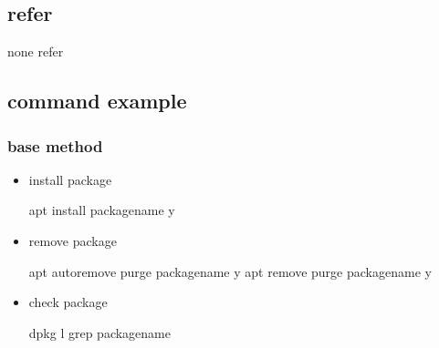 \documentclass[a4paper,10pt,english]{sphinxmanual}
\begin{document}
\subsection{refer}
\label{\detokenize{linux/apt:refer}}
none refer


\subsection{command example}
\label{\detokenize{linux/apt:command-example}}

\subsubsection{base method}
\label{\detokenize{linux/apt:base-method}}\begin{itemize}
\item {} 
install package

\begin{sphinxVerbatim}[commandchars=\\\{\}]
\PYGZdl{} apt install package\PYGZus{}name  \PYGZhy{}y
\end{sphinxVerbatim}

\item {} 
remove package

\begin{sphinxVerbatim}[commandchars=\\\{\}]
\PYGZdl{} apt autoremove \PYGZhy{}\PYGZhy{}purge package\PYGZus{}name \PYGZhy{}y
\PYGZdl{} apt remove \PYGZhy{}\PYGZhy{}purge package\PYGZus{}name \PYGZhy{}y
\end{sphinxVerbatim}

\item {} 
check package

\begin{sphinxVerbatim}[commandchars=\\\{\}]
\PYGZdl{} dpkg \PYGZhy{}l \textbar{} grep package\PYGZus{}name
\end{sphinxVerbatim}

\end{itemize}
\end{document}
